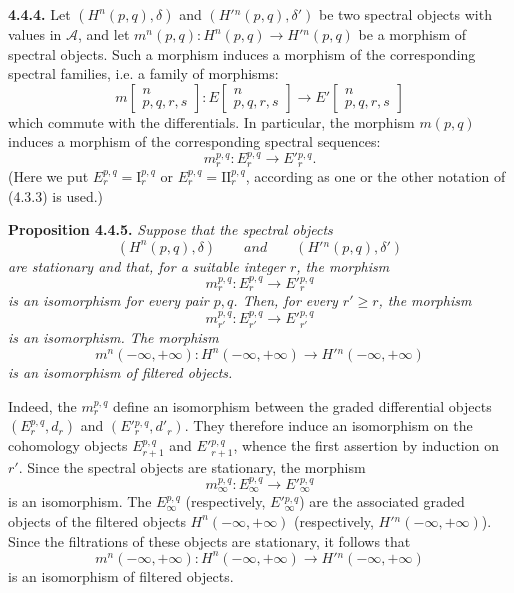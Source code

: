 \clearpage
{}%
\begingroup\small\setlength{\parskip}{0pt}\setlength{\emergencystretch}{1.5em}
\medskip\noindent\textbf{4.4.4.}\quad
Let $(H^n(p,q),\delta)$ and $(H'{}^n(p,q),\delta')$ be two spectral objects
with values in $\mathcal A$, and let
$m^n(p,q)\colon H^n(p,q)\longrightarrow H'{}^n(p,q)$ be a morphism of
spectral objects. Such a morphism induces a morphism of the corresponding
spectral families, i.e. a family of morphisms:
\[
m\!\left[\begin{smallmatrix}n\\p,q,r,s\end{smallmatrix}\right]
\colon
E\!\left[\begin{smallmatrix}n\\p,q,r,s\end{smallmatrix}\right]
\longrightarrow
E'\!\left[\begin{smallmatrix}n\\p,q,r,s\end{smallmatrix}\right]
\]
which commute with the differentials. In particular, the morphism $m(p,q)$
induces a morphism of the corresponding spectral sequences:
\[
m_r^{p,q}\colon E_r^{p,q}\longrightarrow E'{}_{r}^{p,q}.
\]
(Here we put $E_r^{p,q}=\mathrm I_r^{p,q}$ or
$E_r^{p,q}=\mathrm{II}_r^{p,q}$, according as one or the other notation of
(4.3.3) is used.)

\medskip\noindent\textbf{Proposition 4.4.5.}\quad
\textit{Suppose that the spectral objects}
\[
(H^n(p,q),\delta)
\qquad\textit{and}\qquad
(H'{}^n(p,q),\delta')
\]
\textit{are stationary and that, for a suitable integer $r$, the morphism}
\[
m_r^{p,q}\colon E_r^{p,q}\longrightarrow E'{}_{r}^{p,q}
\]
\textit{is an isomorphism for every pair $p,q$. Then, for every $r'\geq r$,
the morphism}
\[
m_{r'}^{p,q}\colon E_{r'}^{p,q}\longrightarrow E'{}_{r'}^{p,q}
\]
\textit{is an isomorphism. The morphism}
\[
m^n(-\infty,+\infty)\colon H^n(-\infty,+\infty)
\longrightarrow H'{}^n(-\infty,+\infty)
\]
\textit{is an isomorphism of filtered objects.}

Indeed, the $m_r^{p,q}$ define an isomorphism between the graded differential
objects $(E_r^{p,q},d_r)$ and $(E'{}_{r}^{p,q},d'_r)$. They therefore induce
an isomorphism on the cohomology objects $E_{r+1}^{p,q}$ and
$E'{}_{r+1}^{p,q}$, whence the first assertion by induction on $r'$. Since
the spectral objects are stationary, the morphism
\[
m_\infty^{p,q}\colon E_\infty^{p,q}\longrightarrow
E'{}_{\infty}^{p,q}
\]
is an isomorphism. The $E_\infty^{p,q}$ (respectively,
$E'{}_{\infty}^{p,q}$) are the associated graded objects of the filtered
objects $H^n(-\infty,+\infty)$ (respectively,
$H'{}^n(-\infty,+\infty)$). Since the filtrations of these objects are
stationary, it follows that
\[
m^n(-\infty,+\infty)\colon H^n(-\infty,+\infty)
\longrightarrow H'{}^n(-\infty,+\infty)
\]
is an isomorphism of filtered objects.
\endgroup
